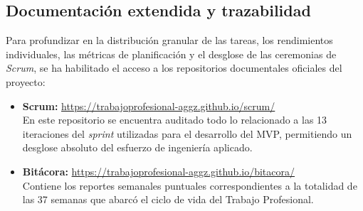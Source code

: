 \subsection{Documentación extendida y trazabilidad}

Para profundizar en la distribución granular de las tareas, los rendimientos individuales, las métricas de planificación y el desglose de las ceremonias de \textit{Scrum}, se ha habilitado el acceso a los repositorios documentales oficiales del proyecto:

\begin{itemize}
    \item \textbf{Scrum:} \href{https://trabajoprofesional-aggz.github.io/scrum/}{https://trabajoprofesional-aggz.github.io/scrum/} \\
    En este repositorio se encuentra auditado todo lo relacionado a las 13 iteraciones del \textit{sprint} utilizadas para el desarrollo del MVP, permitiendo un desglose absoluto del esfuerzo de ingeniería aplicado.
    \item \textbf{Bitácora:} \href{https://trabajoprofesional-aggz.github.io/bitacora/}{https://trabajoprofesional-aggz.github.io/bitacora/} \\
    Contiene los reportes semanales puntuales correspondientes a la totalidad de las 37 semanas que abarcó el ciclo de vida del Trabajo Profesional.
\end{itemize}
